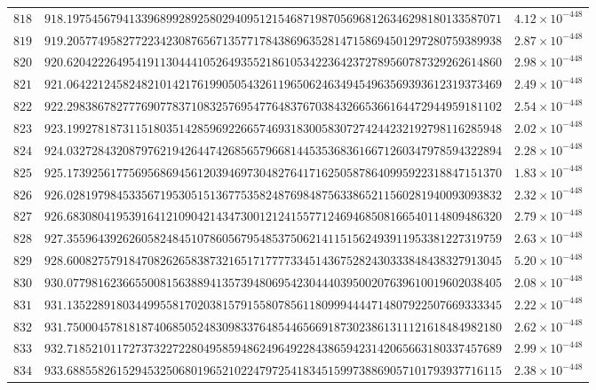 \documentclass[12pt,reqno]{amsart}
\theoremstyle{remark}
\begin{document}
\begin{longtable}{clc}
$818$ & $918.1975456794133968992892580294095121546871987056968126346298180133587071$ & $4.12\times 10^{-448}$ \\
$819$ & $919.2057749582772234230876567135771784386963528147158694501297280759389938$ & $2.87\times 10^{-448}$ \\
$820$ & $920.6204222649541911304441052649355218610534223642372789560787329262614860$ & $2.98\times 10^{-448}$ \\
$821$ & $921.0642212458248210142176199050543261196506246349454963569393612319373469$ & $2.49\times 10^{-448}$ \\
$822$ & $922.2983867827776907783710832576954776483767038432665366164472944959181102$ & $2.54\times 10^{-448}$ \\
$823$ & $923.1992781873115180351428596922665746931830058307274244232192798116285948$ & $2.02\times 10^{-448}$ \\
$824$ & $924.0327284320879762194264474268565796681445353683616671260347978594322894$ & $2.28\times 10^{-448}$ \\
$825$ & $925.1739256177569568694561203946973048276417162505878640995922318847151370$ & $1.83\times 10^{-448}$ \\
$826$ & $926.0281979845335671953051513677535824876984875633865211560281940093093832$ & $2.32\times 10^{-448}$ \\
$827$ & $926.6830804195391641210904214347300121241557712469468508166540114809486320$ & $2.79\times 10^{-448}$ \\
$828$ & $927.3559643926260582484510786056795485375062141151562493911953381227319759$ & $2.63\times 10^{-448}$ \\
$829$ & $928.6008275791847082626583873216517177773345143675282430333848438327913045$ & $5.20\times 10^{-448}$ \\
$830$ & $930.0779816236655008156388941357394806954230444039500207639610019602038405$ & $2.08\times 10^{-448}$ \\
$831$ & $931.1352289180344995581702038157915580785611809994444714807922507669333345$ & $2.22\times 10^{-448}$ \\
$832$ & $931.7500045781818740685052483098337648544656691873023861311121618484982180$ & $2.62\times 10^{-448}$ \\
$833$ & $932.7185210117273732272280495859486249649228438659423142065663180337457689$ & $2.99\times 10^{-448}$ \\
$834$ & $933.6885582615294532506801965210224797254183451599738869057101793937716115$ & $2.38\times 10^{-448}$ \\

\end{longtable}
\end{document}
